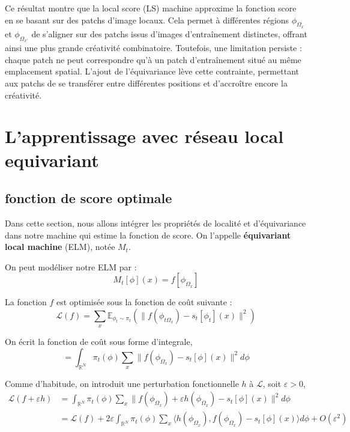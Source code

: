 \documentclass[a4paper,10pt]{article}
\theoremstyle{definition} %
\theoremstyle{definition} %
\theoremstyle{definition} %
\theoremstyle{definition} %
\newcommand{\R}{\mathbb{R}}
\begin{document}
Ce résultat montre que la local score (LS) machine approxime la fonction score en se basant sur des patchs d’image locaux. Cela permet à différentes régions \( \phi_{\Omega_x} \) et \( \phi_{\Omega_{x'}} \) de s’aligner sur des patchs issus d’images d’entraînement distinctes, offrant ainsi une plus grande créativité combinatoire. Toutefois, une limitation persiste : chaque patch ne peut correspondre qu’à un patch d’entraînement situé au même emplacement spatial. L’ajout de l’équivariance lève cette contrainte, permettant aux patchs de se transférer entre différentes positions et d’accroître encore la créativité.

\section{L'apprentissage avec réseau local equivariant}
\subsection{fonction de score optimale}
Dans cette section, nous allons intégrer les propriétés de localité et d'équivariance dans notre machine qui estime la fonction de score. On l'appelle \textbf{équivariant local machine} (ELM), notée $M_t$.

On peut modéliser notre ELM par :
\begin{equation*}
    M_t[\phi](x) = f \left[ \phi_{\Omega_x} \right]
\end{equation*}

La fonction $f$ est optimisée sous la fonction de coût suivante :
\begin{equation*}
    \mathcal{L}(f) = \sum\limits_x \mathbb{E}_{\phi_t \sim \pi_t} \left( \| f(\phi_{t\Omega_x}) - s_t [\phi_t](x) \|^2 \right)
\end{equation*}

On écrit la fonction de coût sous forme d'integrale,
\begin{equation*}
    = \int_{\R^N} \pi_t(\phi) \sum\limits_x \| f(\phi_{\Omega_x}) - s_t [\phi](x) \|^2 d\phi
\end{equation*}

Comme d'habitude, on introduit une perturbation fonctionnelle $h$ à $\mathcal{L}$, soit $\varepsilon > 0$,
\begin{align*}
    \mathcal{L}(f + \varepsilon h) &= \int_{\R^N} \pi_t(\phi) \sum\limits_x \| f(\phi_{\Omega_x}) + \varepsilon h(\phi_{\Omega_x}) - s_t [\phi](x) \|^2 d\phi\\
    &= \mathcal{L}(f) + 2\varepsilon \int_{\R^N} \pi_t(\phi) \sum\limits_x \langle h(\phi_{\Omega_x}), f(\phi_{\Omega_x}) - s_t [\phi](x) \rangle d\phi + O(\varepsilon^2)
\end{align*}
\end{document}
